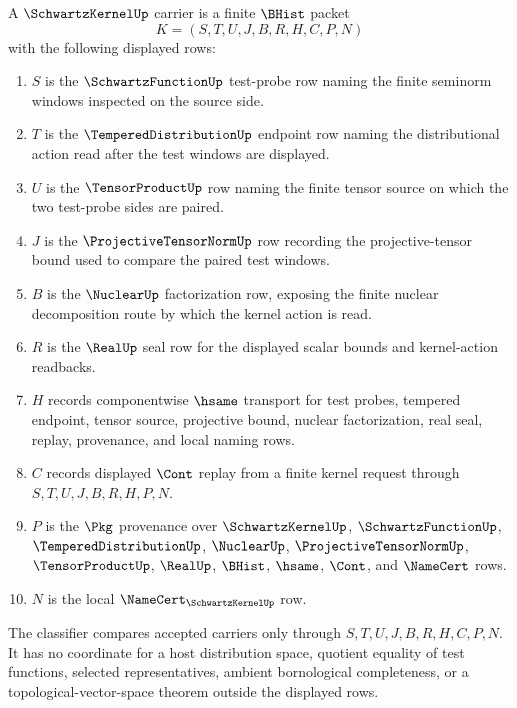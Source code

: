 \begin{definition}
\label{def:schwartz-kernel-carrier}
A $\SchwartzKernelUp$ carrier is a finite $\BHist$ packet
$$
K=(S,T,U,J,B,R,H,C,P,N)
$$
with the following displayed rows:
\begin{enumerate}
\item $S$ is the $\SchwartzFunctionUp$ test-probe row naming the finite seminorm windows inspected on the source side.
\item $T$ is the $\TemperedDistributionUp$ endpoint row naming the distributional action read after the test windows are displayed.
\item $U$ is the $\TensorProductUp$ row naming the finite tensor source on which the two test-probe sides are paired.
\item $J$ is the $\ProjectiveTensorNormUp$ row recording the projective-tensor bound used to compare the paired test windows.
\item $B$ is the $\NuclearUp$ factorization row, exposing the finite nuclear decomposition route by which the kernel action is read.
\item $R$ is the $\RealUp$ seal row for the displayed scalar bounds and kernel-action readbacks.
\item $H$ records componentwise $\hsame$ transport for test probes, tempered endpoint, tensor source, projective bound, nuclear factorization, real seal, replay, provenance, and local naming rows.
\item $C$ records displayed $\Cont$ replay from a finite kernel request through $S,T,U,J,B,R,H,P,N$.
\item $P$ is the $\Pkg$ provenance over $\SchwartzKernelUp$, $\SchwartzFunctionUp$, $\TemperedDistributionUp$, $\NuclearUp$, $\ProjectiveTensorNormUp$, $\TensorProductUp$, $\RealUp$, $\BHist$, $\hsame$, $\Cont$, and $\NameCert$ rows.
\item $N$ is the local $\NameCert_{\SchwartzKernelUp}$ row.
\end{enumerate}
The classifier compares accepted carriers only through $S,T,U,J,B,R,H,C,P,N$. It has no coordinate for a host distribution space, quotient equality of test functions, selected representatives, ambient bornological completeness, or a topological-vector-space theorem outside the displayed rows.
\end{definition}

